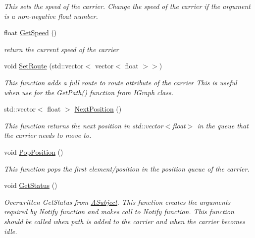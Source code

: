 \begin{DoxyCompactItemize}
\begin{DoxyCompactList}\small\item\em This sets the speed of the carrier. Change the speed of the carrier if the argument is a non-\/negative float number. \end{DoxyCompactList}\item 
\mbox{\label{classcsci3081_1_1Carrier_ab290cc18c82e6104dc1d3e3fa94ec3ff}} 
float \hyperlink{classcsci3081_1_1Carrier_ab290cc18c82e6104dc1d3e3fa94ec3ff}{Get\+Speed} ()
\begin{DoxyCompactList}\small\item\em return the current speed of the carrier \end{DoxyCompactList}\item 
void \hyperlink{classcsci3081_1_1Carrier_a0b8c743cb8ab7843a4cece11225634f4}{Set\+Route} (std\+::vector$<$ vector$<$ float $>$$>$)
\begin{DoxyCompactList}\small\item\em This function adds a full route to route attribute of the carrier This is useful when use for the Get\+Path() function from I\+Graph class. \end{DoxyCompactList}\item 
\mbox{\label{classcsci3081_1_1Carrier_a41a796fd2ee1261ad61dd87e1d4ed54f}} 
std\+::vector$<$ float $>$ \hyperlink{classcsci3081_1_1Carrier_a41a796fd2ee1261ad61dd87e1d4ed54f}{Next\+Position} ()
\begin{DoxyCompactList}\small\item\em This function returns the next position in std\+::vector$<$float$>$ in the queue that the carrier needs to move to. \end{DoxyCompactList}\item 
\mbox{\label{classcsci3081_1_1Carrier_aa181fd3d4bf00e9800c9ddea28930523}} 
void \hyperlink{classcsci3081_1_1Carrier_aa181fd3d4bf00e9800c9ddea28930523}{Pop\+Position} ()
\begin{DoxyCompactList}\small\item\em This function pops the first element/position in the position queue of the carrier. \end{DoxyCompactList}\item 
void \hyperlink{classcsci3081_1_1Carrier_a2b96f30454fee0766a5ed3a26fbf092c}{Get\+Status} ()
\begin{DoxyCompactList}\small\item\em Overwritten Get\+Status from \hyperlink{classcsci3081_1_1ASubject}{A\+Subject}. This function creates the arguments required by Notify function and makes call to Notify function. This function should be called when path is added to the carrier and when the carrier becomes idle. \end{DoxyCompactList}\item 
$$
\end{DoxyCompactItemize}
